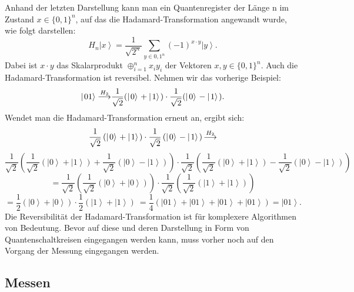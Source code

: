 Anhand der letzten Darstellung kann man ein Quantenregister der Länge n im Zustand
$x\in{\{0,1\}}^n$, auf das die Hadamard-Transformation angewandt wurde, wie folgt darstellen:
$$H_n\left|\left.x\right\rangle\right.=\frac{1}{\sqrt{2^n}}\sum_{y\in{0,1}^n}\left(-1\right)^{x\cdot y}\left|\left.y\right\rangle\right..$$
Dabei ist $x\cdot y$ das Skalarprodukt $\oplus_{i=1}^nx_iy_i$ der Vektoren $x,y\in{\{0,1\}}^n$. 
Auch die Hadamard-Transformation ist reversibel. Nehmen wir das vorherige Beispiel:
$$\left|\left.01\right\rangle\right.{\buildrel H_2\over\longrightarrow}\frac{1}{\sqrt2}(\left|\left.0\right\rangle\right.+\left|\left.1\right\rangle\right.)\cdot\frac{1}{\sqrt2}(\left|\left.0\right\rangle\right.-\left|\left.1\right\rangle\right.).$$
Wendet man die Hadamard-Transformation erneut an, ergibt sich:
$$\frac{1}{\sqrt2}\left(\left|\left.0\right\rangle\right.+\left|\left.1\right\rangle\right.\right)\cdot\frac{1}{\sqrt2}\left(\left|\left.0\right\rangle\right.-\left|\left.1\right\rangle\right.\right){\buildrel H_2\over\longrightarrow}$$
$$\frac{1}{\sqrt2}\left(\frac{1}{\sqrt2}\left(\left|\left.0\right\rangle\right.+\left|\left.1\right\rangle\right.\right)+\frac{1}{\sqrt2}\left(\left|\left.0\right\rangle\right.-\left|\left.1\right\rangle\right.\right)\right)\cdot\frac{1}{\sqrt2}\left(\frac{1}{\sqrt2}\left(\left|\left.0\right\rangle\right.+\left|\left.1\right\rangle\right.\right)-\frac{1}{\sqrt2}\left(\left|\left.0\right\rangle\right.-\left|\left.1\right\rangle\right.\right)\right)$$
$$=\frac{1}{\sqrt2}\left(\frac{1}{\sqrt2}\left(\left|\left.0\right\rangle\right.+\left|\left.0\right\rangle\right.\right)\right)\cdot\frac{1}{\sqrt2}\left(\frac{1}{\sqrt2}\left(\left|\left.1\right\rangle\right.+\left|\left.1\right\rangle\right.\right)\right)$$
$$=\frac{1}{2}\left(\left|\left.0\right\rangle\right.+\left|\left.0\right\rangle\right.\right)\cdot\frac{1}{2}\left(\left|\left.1\right\rangle\right.+\left|\left.1\right\rangle\right.\right)\ =\frac{1}{4}\left(\left|\left.01\right\rangle\right.+\left|\left.01\right\rangle\right.+\left|\left.01\right\rangle\right.+\left|\left.01\right\rangle\right.\right)=\left|\left.01\right\rangle\right..$$
Die Reversibilität der Hadamard-Transformation ist für komplexere Algorithmen von Bedeutung. Bevor auf diese und deren Darstellung in Form von Quantenschaltkreisen eingegangen werden kann, muss vorher noch auf den Vorgang der Messung eingegangen werden.
\subsection{Messen}

